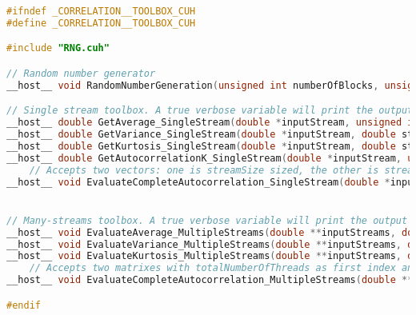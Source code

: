 \begin{lstlisting}[language=C++, caption={\texttt{libraries/CoreLibraries/RandomGenerator/CorrelationToolbox.cuh}}]
#ifndef _CORRELATION__TOOLBOX_CUH
#define _CORRELATION__TOOLBOX_CUH

#include "RNG.cuh"

// Random number generator
__host__ void RandomNumberGeneration(unsigned int numberOfBlocks, unsigned int numberOfThreadsPerBlock, double **uniformNumbers, double **gaussianNumbers, unsigned int totalNumbersToGenerate, unsigned int numbersToGeneratePerThread, unsigned int seed);

// Single stream toolbox. A true verbose variable will print the output for further testing
__host__ double GetAverage_SingleStream(double *inputStream, unsigned int streamSize);
__host__ double GetVariance_SingleStream(double *inputStream, double streamAverage, unsigned int streamSize);
__host__ double GetKurtosis_SingleStream(double *inputStream, double streamAverage, double streamVariance, unsigned int streamSize);
__host__ double GetAutocorrelationK_SingleStream(double *inputStream, unsigned int autocorrelationOffset, unsigned int streamSize);
	// Accepts two vectors: one is streamSize sized, the other is streamSize-2
__host__ void EvaluateCompleteAutocorrelation_SingleStream(double *inputStream, double *outputCorrelations, unsigned int streamSize, bool verbose);


// Many-streams toolbox. A true verbose variable will print the output for further testing
__host__ void EvaluateAverage_MultipleStreams(double **inputStreams, double *outputStreamAverages, unsigned int totalNumberOfThreads, unsigned int numbersToGeneratePerThread, bool verbose);
__host__ void EvaluateVariance_MultipleStreams(double **inputStreams, double *inputStreamAverages, double *outputStreamVariances, unsigned int totalNumberOfThreads, unsigned int numbersToGeneratePerThread, bool verbose);
__host__ void EvaluateKurtosis_MultipleStreams(double **inputStreams, double *inputStreamAverages, double *inputStreamVariances, double *outputStreamKurtosises, unsigned int totalNumberOfThreads, unsigned int numbersToGeneratePerThread, bool verbose);
	// Accepts two matrixes with totalNumberOfThreads as first index and numbersToGeneratePerThread or numbersToGeneratePerThread-2 as second index respectively
__host__ void EvaluateCompleteAutocorrelation_MultipleStreams(double **inputStreams, double **outputStreamCorrelations, unsigned int totalNumberOfThreads, unsigned int numbersToGeneratePerThread, bool verbose);

#endif
\end{lstlisting}

